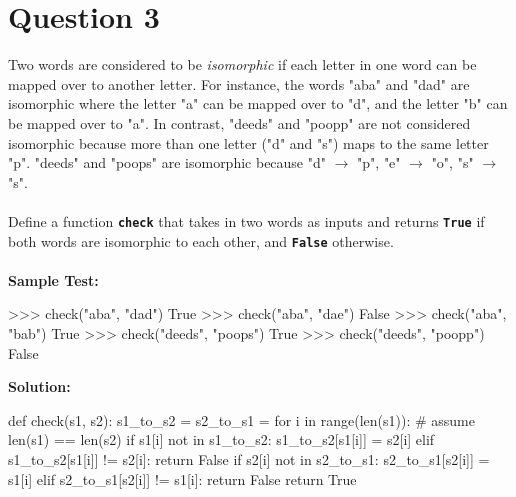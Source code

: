 \section{Question 3}
Two words are considered to be \textit{isomorphic} if each letter in one word can be mapped
over to another letter. For instance, the words "aba" and "dad" are isomorphic where the
letter "a" can be mapped over to "d", and the letter "b" can be mapped over to "a". In
contrast, "deeds" and "poopp" are not considered isomorphic because more than one
letter ("d" and "s") maps to the same letter "p". "deeds" and "poops" are isomorphic
because "d" $\rightarrow$ "p", "e" $\rightarrow$ "o", "s" $\rightarrow$ "s". \\ \\
Define a function \texttt{\bfseries check} that takes in two words as inputs and returns \texttt{\bfseries True} if both
words are isomorphic to each other, and \texttt{\bfseries False} otherwise. \\ \\
\textbf{Sample Test:}
\begin{python}
>>> check("aba", "dad")
True
>>> check("aba", "dae")
False
>>> check("aba", "bab")
True
>>> check("deeds", "poops")
True
>>> check("deeds", "poopp")
False
\end{python}
\textbf{Solution:}
\begin{python}
def check(s1, s2):
    s1_to_s2 = {}
    s2_to_s1 = {}
    for i in range(len(s1)): # assume len(s1) == len(s2)
        if s1[i] not in s1_to_s2:
            s1_to_s2[s1[i]] = s2[i]
        elif s1_to_s2[s1[i]] != s2[i]:
            return False
        if s2[i] not in s2_to_s1:
            s2_to_s1[s2[i]] = s1[i]
        elif s2_to_s1[s2[i]] != s1[i]:
            return False
    return True
\end{python}

